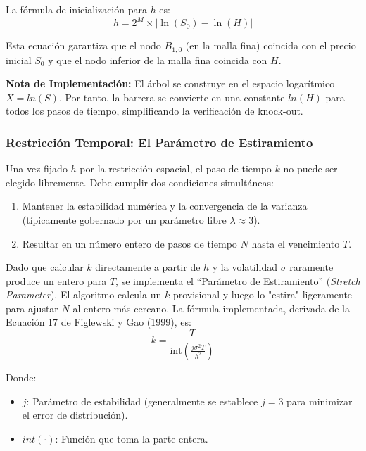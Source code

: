 La fórmula de inicialización para $h$ es: 
\begin{equation} 
  h = 2^M \times | \ln(S_0) - \ln(H) | \label{eq:amm_h_calib} 
\end{equation}

Esta ecuación garantiza que el nodo $B_{1,0}$ (en la malla fina) coincida con el precio inicial $S_0$ y que el nodo inferior de la malla fina coincida con $H$.

\textbf{Nota de Implementación:} El árbol se construye en el espacio logarítmico $X=ln(S)$. Por tanto, la barrera se convierte en una constante $ln(H)$ para todos los pasos de tiempo, simplificando la verificación de knock-out.

\subsubsection{Restricción Temporal: El Parámetro de Estiramiento} 

Una vez fijado $h$ por la restricción espacial, el paso de tiempo $k$ no puede ser elegido libremente. Debe cumplir dos condiciones simultáneas:
\begin{enumerate} 
  \item Mantener la estabilidad numérica y la convergencia de la varianza (típicamente gobernado por un parámetro libre $\lambda\approx3$).
  
  \item Resultar en un número entero de pasos de tiempo $N$ hasta el vencimiento $T$.
\end{enumerate}

Dado que calcular $k$ directamente a partir de $h$ y la volatilidad $\sigma$ raramente produce un entero para $T$, se implementa el ``Parámetro de Estiramiento'' (\textit{Stretch Parameter}). El algoritmo calcula un $k$ provisional y luego lo "estira" ligeramente para ajustar $N$ al entero más cercano.
La fórmula implementada, derivada de la Ecuación 17 de Figlewski y Gao (1999), es:
\begin{equation} 
  k = \frac{T}{\text{int}\left( \frac{j \sigma^2 T}{h^2} \right)} \label{eq:amm_k_stretch} 
\end{equation}

Donde: 
\begin{itemize} 
  \item $j$: Parámetro de estabilidad (generalmente se establece $j=3$ para minimizar el error de distribución). 
  
  \item $int(\cdot)$: Función que toma la parte entera. 
\end{itemize}

